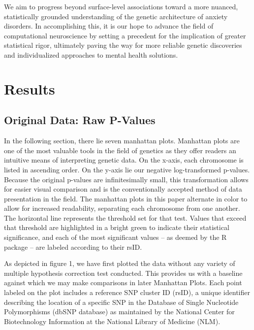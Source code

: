 \documentclass[12pt]{article}
\begin{document}
We aim to progress beyond surface-level associations toward a more nuanced, statistically grounded understanding of the genetic architecture of anxiety disorders. In accomplishing this, it is our hope to advance the field of computational neuroscience by setting a precedent for the implication of greater statistical rigor, ultimately paving the way for more reliable genetic discoveries and individualized approaches to mental health solutions. \par
\newpage


\section{Results}
\subsection{Original Data: Raw P-Values}
In the following section, there lie seven manhattan plots. Manhattan plots are one of the most valuable tools in the field of genetics as they offer readers an intuitive means of interpreting genetic data. On the x-axis, each chromosome is listed in ascending order. On the y-axis lie our negative log-transformed p-values. Because the original p-values are infinitesimally small, this transformation allows for easier visual comparison and is the conventionally accepted method of data presentation in the field. The manhattan plots in this paper alternate in color to allow for increased readability, separating each chromosome from one another. The horizontal line represents the threshold set for that test. Values that exceed that threshold are highlighted in a bright green to indicate their statistical significance, and each of the most significant values -- as deemed by the R package -- are labeled according to their rsID. \par

As depicted in figure 1, we have first plotted the data without any variety of multiple hypothesis correction test conducted. This provides us with a baseline against which we may make comparisons in later Manhattan Plots. Each point labeled on the plot includes a reference SNP cluster ID (rsID), a unique identifier describing the location of a specific SNP in the Database of Single Nucleotide Polymorphisms (dbSNP database) as maintained by the National Center for Biotechnology Information at the National Library of Medicine (NLM). \par
\end{document}
